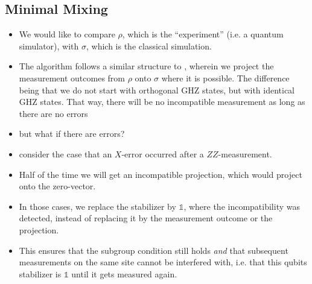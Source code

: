 \subsection{Minimal Mixing}
\begin{itemize}
  \item We would like to compare $\rho$, which is the \enquote{experiment}
    (i.e. a quantum simulator), with $\sigma$, which is the classical
    simulation.
  \item The algorithm follows a similar structure to
    \cite{liCrossEntropyBenchmark2023}, wherein we project the measurement
    outcomes from $\rho$ onto $\sigma$ where it is possible. The difference
    being that we do not start with orthogonal GHZ states, but with identical
    GHZ states. That way, there will be no incompatible measurement as long as
    there are no errors
  \item but what if there are errors?
  \item consider the case that an $X$-error occurred after a $ZZ$-measurement.
  \item Half of the time we will get an incompatible projection, which would
    project onto the zero-vector.
  \item In those cases, we replace the stabilizer by $\mathds{1}$, where the
    incompatibility was detected, instead of replacing it by the measurement
    outcome or the projection.
  \item This ensures that the subgroup condition still holds \emph{and} that
    subsequent measurements on the same site cannot be interfered with, i.e.
    that this qubits stabilizer is $\mathds{1}$ until it gets measured again.
\end{itemize}
